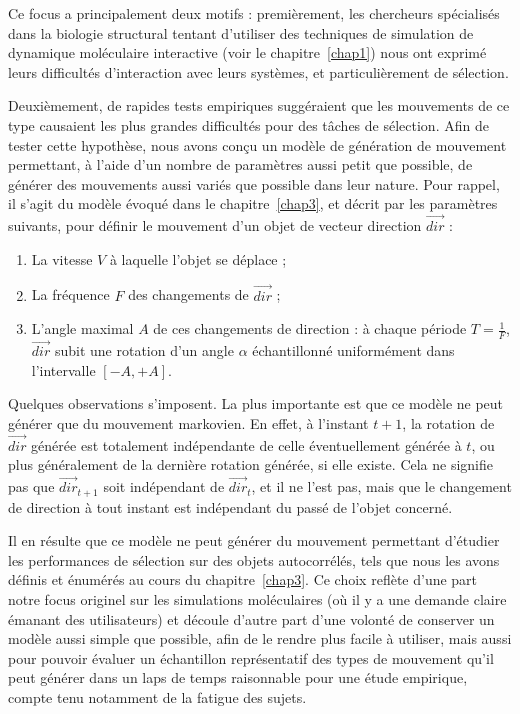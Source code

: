 	Ce focus a principalement deux motifs : premièrement, les chercheurs spécialisés dans la biologie structural tentant d'utiliser des techniques de simulation de dynamique moléculaire interactive (voir le chapitre~\ref{chap1}) nous ont exprimé leurs difficultés d'interaction avec leurs systèmes, et particulièrement de sélection.
	
	Deuxièmement, de rapides tests empiriques suggéraient que les mouvements de ce type causaient les plus grandes difficultés pour des tâches de sélection. Afin de tester cette hypothèse, nous avons conçu un modèle de génération de mouvement permettant, à l'aide d'un nombre de paramètres aussi petit que possible, de générer des mouvements aussi variés que possible dans leur nature. Pour rappel, il s'agit du modèle évoqué dans le chapitre~\ref{chap3}, et décrit par les paramètres suivants, pour définir le mouvement d'un objet de vecteur direction $\vec{dir}$ :
	
    \begin{enumerate}
    	\item La vitesse $V$ à laquelle l'objet se déplace ;
    	\item La fréquence $F$ des changements de $\vec{dir}$ ;
    	\item L'angle maximal $A$ de ces changements de direction : à chaque période $T = \frac{1}{F}$, $\vec{dir}$ subit une rotation d'un angle $\alpha$ échantillonné uniformément dans l'intervalle $[-A, +A]$.
    \end{enumerate}
    
    Quelques observations s'imposent. La plus importante est que ce modèle ne peut générer que du mouvement markovien. En effet, à l'instant $t+1$, la rotation de $\vec{dir}$ générée est totalement indépendante de celle éventuellement générée à $t$, ou plus généralement de la dernière rotation générée, si elle existe. Cela ne signifie pas que $\vec{dir}_{t+1}$ soit indépendant de $\vec{dir}_{t}$, et il ne l'est pas, mais que le changement de direction à tout instant est indépendant du passé de l'objet concerné.
    
    Il en résulte que ce modèle ne peut générer du mouvement permettant d'étudier les performances de sélection sur des objets autocorrélés, tels que nous les avons définis et énumérés au cours du chapitre~\ref{chap3}. Ce choix reflète d'une part notre focus originel sur les simulations moléculaires (où il y a une demande claire émanant des utilisateurs) et découle d'autre part d'une volonté de conserver un modèle aussi simple que possible, afin de le rendre plus facile à utiliser, mais aussi pour pouvoir évaluer un échantillon représentatif des types de mouvement qu'il peut générer dans un laps de temps raisonnable pour une étude empirique, compte tenu notamment de la fatigue des sujets.

